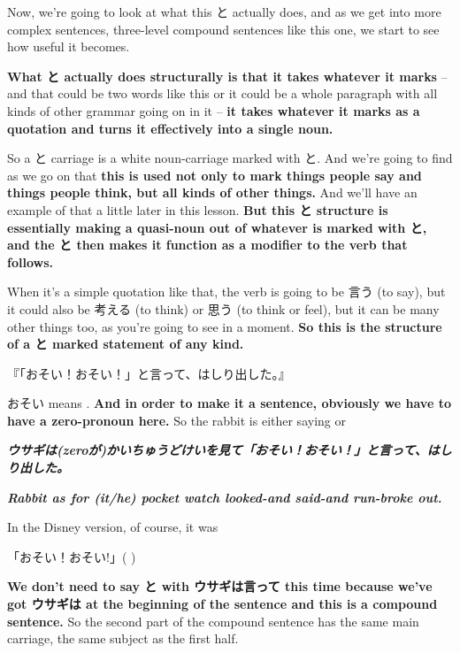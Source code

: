 Now, we're going to look at what this と actually does, and as we get into more complex sentences, three-level compound sentences like this one, we start to see how useful it becomes.

{}

{\bf What と actually does structurally is that it takes whatever it marks} -- and that could be two words like this or it could be a whole paragraph with all kinds of other grammar going on in it -- {\bf it takes whatever it marks as a quotation and turns it effectively into a single noun.}

\thinrule

So a と carriage is a white noun-carriage marked with と. And we're going to find as we go on that {\bf this is used not only to mark things people say and things people think, but all kinds of other things.} And we'll have an example of that a little later in this lesson. {\bf But this と structure is essentially making a quasi-noun out of whatever is marked with と, and the と then makes it function as a modifier to the verb that follows.}

{}

When it's a simple quotation like that, the verb is going to be 言う (to say), but it could also be 考える (to think) or 思う (to think or feel), but it can be many other things too, as you're going to see in a moment. {\bf So this is the structure of a と marked statement of any kind.}

『「おそい！おそい！」と言って、はしり出した。』

おそい means . {\bf And in order to make it a sentence, obviously we have to have a zero-pronoun here.} So the rabbit is either saying  or 

{}

{\bf {\em ウサギは(zeroが)かいちゅうどけいを見て「おそい！おそい！」と言って、はしり出した。}}

{\bf {\em Rabbit as for (it/he) pocket watch looked-and  said-and run-broke out.}}

In the Disney version, of course, it was 

「おそい！おそい!」( )

{\bf We don't need to say と with ウサギは言って this time because we've got ウサギは at the beginning of the sentence and this is a compound sentence.} So the second part of the compound sentence has the same main carriage, the same subject as the first half.

